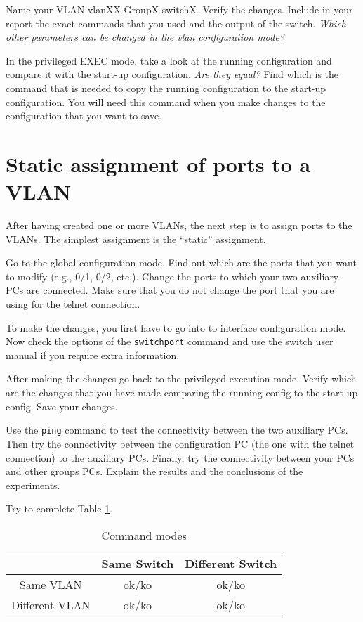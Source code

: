 Name your VLAN vlanXX-GroupX-switchX.
Verify the changes.
Include in your report the exact commands that you used and the output of the switch.
\emph{Which other parameters can be changed in the vlan configuration mode?}

In the privileged EXEC mode, take a look at the running configuration and compare it with the start-up configuration.
\emph{Are they equal?}
Find which is the command that is needed to copy the running configuration to the start-up configuration.
You will need this command when you make changes to the configuration that you want to save.

\section{Static assignment of ports to a VLAN}
\label{sec:static}

After having created one or more VLANs, the next step is to assign ports to the VLANs.
The simplest assignment is the ``static'' assignment.

Go to the global configuration mode.
Find out which are the ports that you want to modify (e.g., 0/1, 0/2, etc.).
Change the ports to which your two auxiliary PCs are connected.
Make sure that you do not change the port that you are using for the telnet connection.

To make the changes, you first have to go into to interface configuration mode.
Now check the options of the \texttt{switchport} command and use the switch user manual if you require extra information.

After making the changes go back to the privileged execution mode.
Verify which are the changes that you have made comparing the running config to the start-up config.
Save your changes.

Use the \texttt{ping} command to test the connectivity between the two auxiliary PCs.
Then try the connectivity between the configuration PC (the one with the telnet connection) to the auxiliary PCs.
Finally, try the connectivity between your PCs and other groups PCs.
Explain the results and the conclusions of the experiments.

Try to complete Table \ref{tab:connectivity}.

\begin{table}[!t]
\renewcommand{\arraystretch}{1.3}
\caption{Command modes}
\label{tab:connectivity}
\centering
\begin{tabular}{|c|c|c|}
\hline
& Same Switch & Different Switch\\
\hline
Same VLAN & ok/ko & ok/ko \\
\hline
Different VLAN & ok/ko & ok/ko \\
\hline
\end{tabular}
\end{table}

